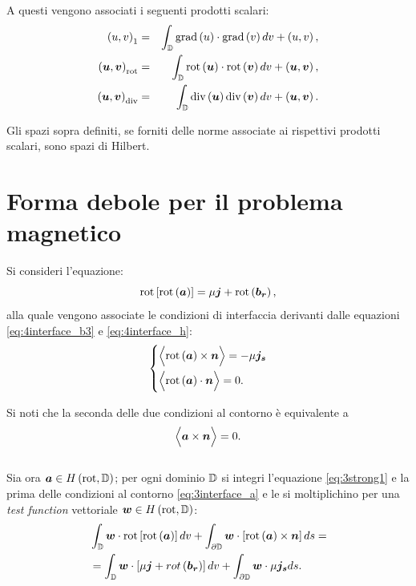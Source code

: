 A questi vengono associati i seguenti prodotti scalari:
\begin{eqnarray}
\label{eq:3scah1}
\left(u,v\right)_1 &=& \int_{\mathbb{D}} \text{grad}\left(u\right)\cdot\text{grad}\left(v\right)dv+\left(u,v\right),\\
\label{eq:3scahcurl}
\left(\boldsymbol{u},\boldsymbol{v}\right)_{\text{rot}} &=& \int_{\mathbb{D}}\text{rot}\left(\boldsymbol{u}\right)\cdot\text{rot}\left(\boldsymbol{v}\right)dv+\left(\boldsymbol{u},\boldsymbol{v}\right),\\
\label{eq:3scahdiv}
\left(\boldsymbol{u},\boldsymbol{v}\right)_{\text{div}} &=& \int_{\mathbb{D}}\text{div}\left(\boldsymbol{u}\right)\text{div}\left(\boldsymbol{v}\right)dv+\left(\boldsymbol{u},\boldsymbol{v}\right).
\end{eqnarray}

Gli spazi sopra definiti, se forniti delle norme associate ai rispettivi prodotti scalari,  sono spazi di Hilbert.

\section{Forma debole per il problema magnetico}

Si consideri l'equazione:
\begin{equation}
\text{rot}\left[\text{rot}\left(\boldsymbol{a}\right)\right] = \mu\boldsymbol{j}+\text{rot}\left(\boldsymbol{b_r}\right),
\label{eq:3strong1}
\end{equation}
alla quale vengono associate le condizioni di interfaccia derivanti dalle equazioni \eqref{eq:4interface_b3} e \eqref{eq:4interface_h}:
\begin{equation}
\left\{
\begin{aligned}
&\Bigl\langle \text{rot}\left(\boldsymbol{a}\right)\times \boldsymbol{n}\Bigr\rangle = -\mu\boldsymbol{j_s} \\
&\Bigl\langle \text{rot}\left(\boldsymbol{a}\right)\cdot \boldsymbol{n}\Bigr\rangle = 0.
\end{aligned}
\right.
\label{eq:3interface_a}
\end{equation}

Si noti che la seconda delle due condizioni al contorno è equivalente a
\begin{equation}
\label{eq:3interface_a2}
\Bigl\langle \boldsymbol{a}\times \boldsymbol{n}\Bigr\rangle = 0.
\end{equation}
\\
Sia ora $\boldsymbol{a}\in H\left(\text{rot},\mathbb{D}\right)$; per ogni dominio $\mathbb{D}$ si integri l'equazione \eqref{eq:3strong1} e la prima delle condizioni al contorno \eqref{eq:3interface_a} e le si moltiplichino per una \textit{test function} vettoriale $\boldsymbol{w} \in H\left(\text{rot},\mathbb{D}\right)$:
\begin{align}
\label{eq:3weak1}
&\int_{\mathbb{D}}\boldsymbol{w} \cdot \text{rot}\left[\text{rot}\left(\boldsymbol{a}\right)\right] dv+\int_{\partial\mathbb{D}}\boldsymbol{w}\cdot \left[\text{rot}\left(\boldsymbol{a}\right)\times\boldsymbol{n}\right]ds= \nonumber\\
&=\int_{\mathbb{D}}\boldsymbol{w}\cdot\left[\mu\boldsymbol{j}+rot\left(\boldsymbol{b_r}\right)\right]dv+\int_{\partial\mathbb{D}}\boldsymbol{w}\cdot \mu\boldsymbol{j_s} ds.
\end{align}

